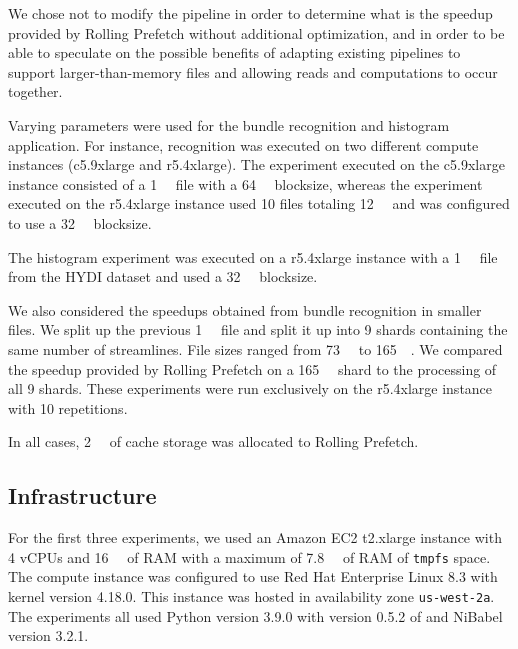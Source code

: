 We chose not to modify the pipeline in order to determine what is the speedup
provided by Rolling Prefetch without additional optimization, and in order to be
able to speculate on the possible benefits of adapting existing pipelines to
support larger-than-memory files and allowing reads and computations to occur
together.

Varying parameters were used for the bundle recognition and histogram
application. For instance, recognition was executed on two different compute
instances (c5.9xlarge and r5.4xlarge). The experiment executed on the c5.9xlarge
instance consisted of a \SI{1}{\gibi\byte} file with a \SI{64}{\mebi\byte}
blocksize, whereas the experiment executed on the r5.4xlarge instance used 10
files totaling \SI{12}{\gibi\byte} and was configured to use a
\SI{32}{\mebi\byte} blocksize. 

The histogram experiment was executed on a r5.4xlarge instance with a
\SI{1}{\gibi\byte} file from the HYDI dataset and used a \SI{32}{\mebi\byte}
blocksize.

We also considered the speedups obtained from bundle recognition in smaller
files. We split up the previous \SI{1}{\gibi\byte} file and split it up into 9
shards containing the same number of streamlines. File sizes ranged from
\SI{73}{\mebi\byte} to \SI{165}{\mebi\byte}. We compared the speedup provided by
Rolling Prefetch on a \SI{165}{\mebi\byte} shard to the processing of all 9
shards. These experiments were run exclusively on the r5.4xlarge instance with
10 repetitions.


In all cases, \SI{2}{\gibi\byte} of cache storage was allocated to Rolling
Prefetch.

\subsection{Infrastructure}

For the first three experiments, we used an Amazon EC2 t2.xlarge instance with 4
vCPUs and \SI{16}{\gibi\byte} of RAM with a maximum of \SI{7.8}{\gibi\byte} of
RAM of \texttt{tmpfs} space. The compute instance was configured to use Red Hat
Enterprise Linux 8.3 with kernel version 4.18.0. This instance was hosted in
availability zone \texttt{us-west-2a}. The experiments all used Python version
3.9.0 with version 0.5.2 of \sfs and NiBabel version 3.2.1.

